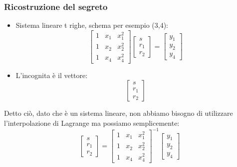 \documentclass{book}
\begin{document}
\subsubsection{Ricostruzione del segreto}
\begin{itemize}
	\item Sistema lineare t righe, schema per esempio (3,4):\begin{equation*}
		      \begin{bmatrix}
			      1 & x_{1} & x_{1}^{2} \\
			      1 & x_{2} & x_{2}^{2} \\
			      1 & x_{4} & x_{4}^{2}
		      \end{bmatrix}\begin{bmatrix}
			      s \\r_{1}\\r_{2}
		      \end{bmatrix}=\begin{bmatrix}
			      y_{1} \\y_{2}\\y_{4}
		      \end{bmatrix}
	      \end{equation*}
	\item L'incognita è il vettore:\begin{equation*}
		      \begin{bmatrix}
			      s \\r_{1}\\r_{2}
		      \end{bmatrix}
	      \end{equation*}
\end{itemize}
Detto ciò, dato che è un sistema lineare, non abbiamo bisogno di utilizzare l'interpolazione di Lagrange ma possiamo semplicemente:\begin{equation*}
	\begin{bmatrix}
		s \\r_{1}\\r_{2}
	\end{bmatrix}={\begin{bmatrix}
		1 & x_{1} & x_{1}^{2} \\
		1 & x_{2} & x_{2}^{2} \\
		1 & x_{4} & x_{4}^{2}
	\end{bmatrix}}^{-1}\begin{bmatrix}
		y_{1} \\y_{2}\\y_{4}
	\end{bmatrix}
\end{equation*}
\end{document}

